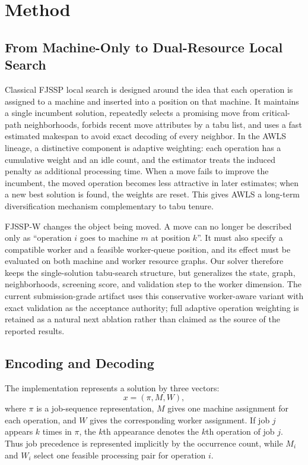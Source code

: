 \documentclass[sigconf,anonymous,review,dvipsnames]{acmart}
\begin{document}
\section{Method}
\subsection{From Machine-Only to Dual-Resource Local Search}
Classical FJSSP local search is designed around the idea that each operation is assigned to a machine and inserted into a position on that machine.
It maintains a single incumbent solution, repeatedly selects a promising move from critical-path neighborhoods, forbids recent move attributes by a tabu list, and uses a fast estimated makespan to avoid exact decoding of every neighbor.
In the AWLS lineage, a distinctive component is adaptive weighting: each operation has a cumulative weight and an idle count, and the estimator treats the induced penalty as additional processing time.
When a move fails to improve the incumbent, the moved operation becomes less attractive in later estimates; when a new best solution is found, the weights are reset.
This gives AWLS a long-term diversification mechanism complementary to tabu tenure.

FJSSP-W changes the object being moved.
A move can no longer be described only as ``operation $i$ goes to machine $m$ at position $k$''.
It must also specify a compatible worker and a feasible worker-queue position, and its effect must be evaluated on both machine and worker resource graphs.
Our solver therefore keeps the single-solution tabu-search structure, but generalizes the state, graph, neighborhoods, screening score, and validation step to the worker dimension.
The current submission-grade artifact uses this conservative worker-aware variant with exact validation as the acceptance authority; full adaptive operation weighting is retained as a natural next ablation rather than claimed as the source of the reported results.

\subsection{Encoding and Decoding}
The implementation represents a solution by three vectors:
\[
  x = (\pi, M, W),
\]
where $\pi$ is a job-sequence representation, $M$ gives one machine assignment for each operation, and $W$ gives the corresponding worker assignment.
If job $j$ appears $k$ times in $\pi$, the $k$th appearance denotes the $k$th operation of job $j$.
Thus job precedence is represented implicitly by the occurrence count, while $M_i$ and $W_i$ select one feasible processing pair for operation $i$.
\end{document}
